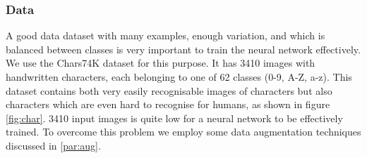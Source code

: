\documentclass{article}
\begin{document}
\subsubsection{Data}
\label{sec:data}
A good data dataset with many examples, enough variation, and which is balanced between classes is very important to train the neural network effectively. 
We use the Chars74K dataset for this purpose. It has 3410 images with handwritten characters, each belonging to one of 62 classes (0-9, A-Z, a-z). 
This dataset contains both very easily recognisable images of characters but also characters which are even hard to recognise for humans, as shown in figure \ref{fig:char}. 
3410 input images is quite low for a neural network to be effectively trained. To overcome this problem we employ some data augmentation techniques discussed in \ref{par:aug}. 
\end{document}
